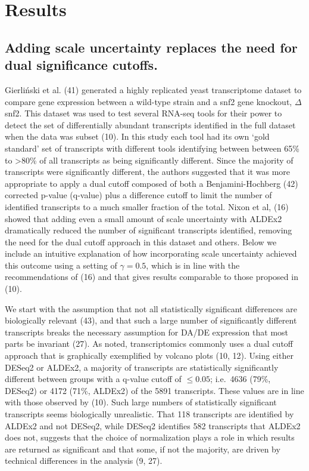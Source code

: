 \documentclass[
]{article}
\begin{document}
\section{Results}\label{results}

\subsection{Adding scale uncertainty replaces the need for dual
significance
cutoffs.}\label{adding-scale-uncertainty-replaces-the-need-for-dual-significance-cutoffs.}

Gierliński et al. (41) generated a highly replicated yeast transcriptome
dataset to compare gene expression between a wild-type strain and a snf2
gene knockout, \(\Delta\)snf2. This dataset was used to test several
RNA-seq tools for their power to detect the set of differentially
abundant transcripts identified in the full dataset when the data was
subset (10). In this study each tool had its own `gold standard' set of
transcripts with different tools identifying between between 65\% to
\textgreater80\% of all transcripts as being significantly different.
Since the majority of transcripts were significantly different, the
authors suggested that it was more appropriate to apply a dual cutoff
composed of both a Benjamini-Hochberg (42) corrected p-value (q-value)
plus a difference cutoff to limit the number of identified transcripts
to a much smaller fraction of the total. Nixon et al, (16) showed that
adding even a small amount of scale uncertainty with ALDEx2 dramatically
reduced the number of significant transcripts identified, removing the
need for the dual cutoff approach in this dataset and others. Below we
include an intuitive explanation of how incorporating scale uncertainty
achieved this outcome using a setting of \(\gamma=0.5\), which is in
line with the recommendations of (16) and that gives results comparable
to those proposed in (10).

We start with the assumption that not all statistically significant
differences are biologically relevant (43), and that such a large number
of significantly different transcripts breaks the necessary assumption
for DA/DE expression that most parts be invariant (27). As noted,
transcriptomics commonly uses a dual cutoff approach that is graphically
exemplified by volcano plots (10, 12). Using either DESeq2 or ALDEx2, a
majority of transcripts are statistically significantly different
between groups with a q-value cutoff of \(\le 0.05\); i.e.~4636 (79\%,
DESeq2) or 4172 (71\%, ALDEx2) of the 5891 transcripts. These values are
in line with those observed by (10). Such large numbers of statistically
significant transcripts seems biologically unrealistic. That 118
transcripts are identified by ALDEx2 and not DESeq2, while DESeq2
identifies 582 transcripts that ALDEx2 does not, suggests that the
choice of normalization plays a role in which results are returned as
significant and that some, if not the majority, are driven by technical
differences in the analysis (9, 27).
\end{document}
